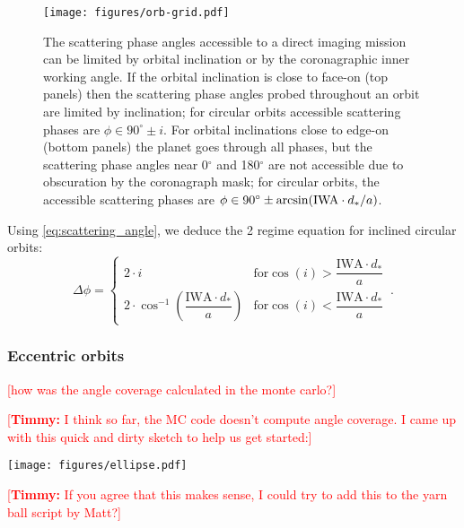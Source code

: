 \documentclass[
    usenatbib,
]{mnras}
\newcommand{\todo}[1]{\textcolor{red}{[#1]}}
\newcommand{\timmy}[1]{\textcolor{red}{[\textbf{Timmy:} #1]}}
\begin{document}
\begin{figure}
   \centering
   \texttt{[image: figures/orb-grid.pdf]}
   \caption{
        The scattering phase angles accessible to a direct imaging mission can be limited by orbital inclination or by the coronagraphic inner working angle. 
        If the orbital inclination is close to face-on (top panels) then the scattering phase angles probed throughout an orbit are limited by inclination; for circular orbits accessible scattering phases are $\phi \in 90^\circ \pm i$. 
        For orbital inclinations close to edge-on (bottom panels) the planet goes through all phases, but the scattering phase angles near 0$^\circ$ and 180$^\circ$ are not accessible due to obscuration by the coronagraph mask; for circular orbits, the accessible scattering phases are $\phi \in 90^\circ \pm \arcsin({\rm IWA}\cdot d_*/a)$.
    }
    \label{fig:orb-grid}
\end{figure}

Using \cref{eq:scattering_angle}, we deduce the 2 regime equation for inclined circular orbits: 
\begin{equation}
\label{eq:Delta_phi_max}
    \Delta \phi = 
    \begin{cases}
        2 \cdot i & \textrm{for} \cos(i) > \dfrac{\mathrm{IWA}\cdot d_* }{a}
  \\ 
        2 \cdot \cos^{-1}\left(\dfrac{\mathrm{IWA}\cdot d_* }{a}\right)  & \textrm{for} \cos(i) < \dfrac{\mathrm{IWA}\cdot d_* }{a}
    \end{cases}\,.
\end{equation}


\subsubsection{Eccentric orbits}

\todo{how was the angle coverage calculated in the monte carlo?}

\timmy{I think so far, the MC code doesn't compute angle coverage. I came up with this quick and dirty sketch to help us get started:}

\texttt{[image: figures/ellipse.pdf]}

\timmy{If you agree that this makes sense, I could try to add this to the yarn ball script by Matt?}

\end{document}

